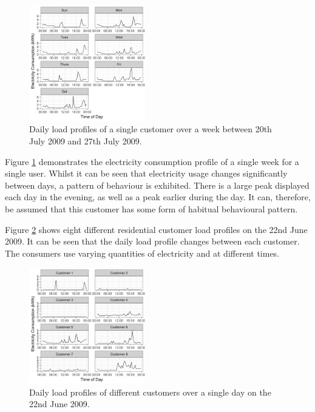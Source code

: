 \begin{figure}[b]
	\includegraphics[width=0.45\textwidth]{figures/Rplot01.png}
	\caption{Daily load profiles of a single customer over a week between 20th July 2009 and 27th July 2009. }
	\label{fig:single_user}
\end{figure}

Figure \ref{fig:single_user} demonstrates the electricity consumption profile of a single week for a single user. Whilst it can be seen that electricity usage changes significantly between days, a pattern of behaviour is exhibited. There is a large peak displayed each day in the evening, as well as a peak earlier during the day. It can, therefore, be assumed that this customer has some form of habitual behavioural pattern. 

Figure \ref{fig:multiple_users} shows eight different residential customer load profiles on the 22nd June 2009. It can be seen that the daily load profile changes between each customer. The consumers use varying quantities of electricity and at different times. 




\begin{figure}
	\includegraphics[width=0.45\textwidth]{figures/Rplot02.png}
	\caption{Daily load profiles of different customers over a single day on the 22nd June 2009.}
	\label{fig:multiple_users}
\end{figure}


